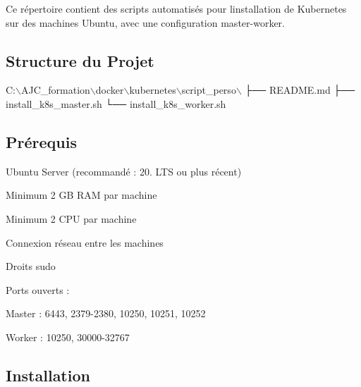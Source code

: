 Ce répertoire contient des scripts automatisés pour l\textquotesingle{}installation de Kubernetes sur des machines Ubuntu, avec une configuration master-\/worker.

\subsection*{Structure du Projet}


\begin{DoxyCode}
C:\(\backslash\)AJC\_formation\(\backslash\)docker\(\backslash\)kubernetes\(\backslash\)script\_perso\(\backslash\)
├── README.md
├── install\_k8s\_master.sh
└── install\_k8s\_worker.sh
\end{DoxyCode}


\subsection*{Prérequis}


\begin{DoxyItemize}
\item Ubuntu Server (recommandé \+: 20. L\+TS ou plus récent)
\item Minimum 2 GB R\+AM par machine
\item Minimum 2 C\+PU par machine
\item Connexion réseau entre les machines
\item Droits sudo
\item Ports ouverts \+:
\begin{DoxyItemize}
\item Master \+: 6443, 2379-\/2380, 10250, 10251, 10252
\item Worker \+: 10250, 30000-\/32767
\end{DoxyItemize}
\end{DoxyItemize}

\subsection*{Installation}


